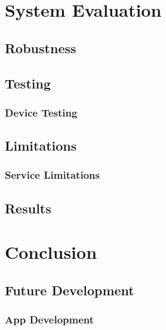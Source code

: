 \chapter{System Evaluation}
\section{Robustness}

\section{Testing}
\subsection{Device Testing}

\section{Limitations}
\subsection{Service Limitations}

\section{Results}

\chapter{Conclusion}
\section{Future Development}
\subsection{App Development}

